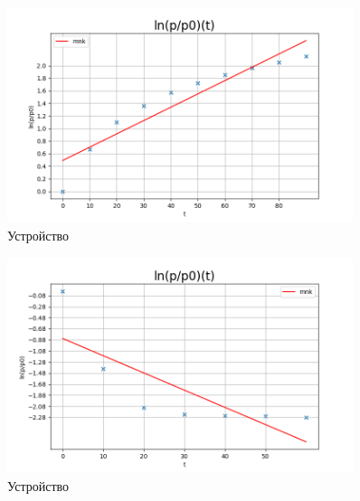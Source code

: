 \documentclass[a4paper]{article}
\begin{document}
\begin{figure}
    \centering
    \includegraphics[width=0.9\textwidth]{bad.PNG}
    \caption{Устройство}
\end{figure}

\begin{figure}
    \centering
    \includegraphics[width=0.9\textwidth]{good.PNG}
    \caption{Устройство}
\end{figure}
\end{document}
